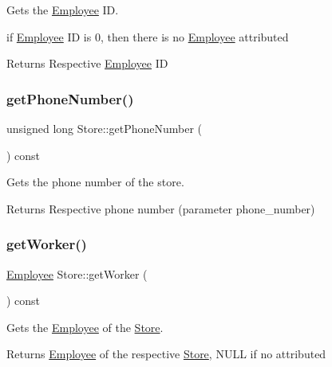 Gets the \hyperlink{class_employee}{Employee} ID. 

if \hyperlink{class_employee}{Employee} ID is 0, then there is no \hyperlink{class_employee}{Employee} attributed

\begin{DoxyReturn}{Returns}
Respective \hyperlink{class_employee}{Employee} ID 
\end{DoxyReturn}
\mbox{\label{class_store_afbef10a37143ea91b200d50e8e6b83d7}} 
\subsubsection{\texorpdfstring{get\+Phone\+Number()}{getPhoneNumber()}}
{\footnotesize\ttfamily unsigned long Store\+::get\+Phone\+Number (\begin{DoxyParamCaption}{ }\end{DoxyParamCaption}) const}



Gets the phone number of the store. 

\begin{DoxyReturn}{Returns}
Respective phone number (parameter phone\+\_\+number) 
\end{DoxyReturn}
\mbox{\label{class_store_ab4b4d6e958e7d26398f3e6e0e932c920}} 
\subsubsection{\texorpdfstring{get\+Worker()}{getWorker()}}
{\footnotesize\ttfamily \hyperlink{class_employee}{Employee} Store\+::get\+Worker (\begin{DoxyParamCaption}{ }\end{DoxyParamCaption}) const}



Gets the \hyperlink{class_employee}{Employee} of the \hyperlink{class_store}{Store}. 

\begin{DoxyReturn}{Returns}
\hyperlink{class_employee}{Employee} of the respective \hyperlink{class_store}{Store}, N\+U\+LL if no attributed 
\end{DoxyReturn}
\mbox{\label{class_store_a4dfd27a0615f161f2f0e94297bb54969}} 
